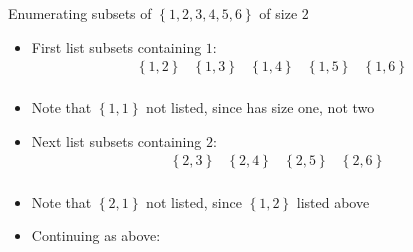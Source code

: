 \documentclass{beamer}
\theoremstyle{definition}
\begin{document}
\begin{frame}{Enumerating subsets of $\left\{1,2,3,4,5,6\right\}$ of size $2$}
\begin{itemize}
\item First list subsets containing $1$:
\[\begin{array}{ccccc}
\left\{1,2\right\}&\left\{1,3\right\}&\left\{1,4\right\}&\left\{1,5\right\}
  &\left\{1,6\right\}\\
\end{array}\]
\item Note that $\left\{1,1\right\}$ not listed, since has size one, not two
\item Next list subsets containing $2$:
\[\begin{array}{ccccc}
&\left\{2,3\right\}&\left\{2,4\right\}&\left\{2,5\right\}&\left\{2,6\right\}\\
\end{array}\]
\item Note that $\left\{2,1\right\}$ not listed, since $\left\{1,2\right\}$
listed above
\item Continuing as above:
\end{itemize}
\end{frame}
\end{document}
